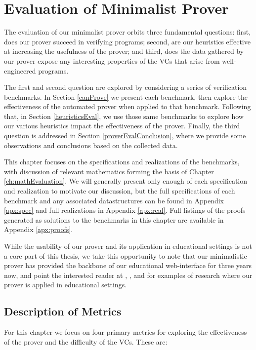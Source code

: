 


\chapter{Evaluation of Minimalist Prover\label{ch:proverEvaluation}}
The evaluation of our minimalist prover orbits three fundamental questions: first, does our prover succeed in verifying programs; second, are our heuristics effective at increasing the usefulness of the prover; and third, does the data gathered by our prover expose any interesting properties of the VCs that arise from well-engineered programs.

The first and second question are explored by considering a series of verification benchmarks.  In Section \ref{canProve} we present each benchmark, then explore the effectiveness of the automated prover when applied to that benchmark.  Following that, in Section \ref{heuristicsEval}, we use those same benchmarks to explore how our various heuristics impact the effectiveness of the prover.  Finally, the third question is addressed in Section \ref{proverEvalConclusion}, where we provide some observations and conclusions based on the collected data.

This chapter focuses on the specifications and realizations of the benchmarks, with discussion of relevant mathematics forming the basis of Chapter \ref{ch:mathEvaluation}.  We will generally present only enough of each specification and realization to motivate our discussion, but the full specifications of each benchmark and any associated datastructures can be found in Appendix \ref{apx:spec} and full realizations in Appendix \ref{apx:real}.  Full listings of the proofs generated as solutions to the benchmarks in this chapter are available in Appendix \ref{apx:proofs}.

While the usability of our prover and its application in educational settings is not a core part of this thesis, we take this opportunity to note that our minimalistic prover has provided the backbone of our educational web-interface for three years now, and point the interested reader at \cite{something}, \cite{something}, and \cite{something} for examples of research where our prover is applied in educational settings.


\section{Description of Metrics}
For this chapter we focus on four primary metrics for exploring the effectiveness of the prover and the difficulty of the VCs.  These are:

